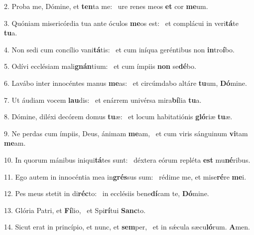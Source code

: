 2. Proba me, Dómine, et \textbf{ten}ta me: \ast\  ure renes meos \textbf{et} cor \textbf{me}um.\

3. Quóniam misericórdia tua ante óculos \textbf{me}os est: \ast\  et complácui in veri\textbf{tá}te \textbf{tu}a.\

4. Non sedi cum concílio vani\textbf{tá}tis: \ast\  et cum iníqua geréntibus non \textbf{in}tro\textbf{í}bo.\

5. Odívi ecclésiam mali\textbf{gnán}tium: \ast\  et cum ímpiis \textbf{non} se\textbf{dé}bo.\

6. Lavábo inter innocéntes manus \textbf{me}as: \ast\  et circúmdabo altáre \textbf{tu}um, \textbf{Dó}mine.\

7. Ut áudiam vocem \textbf{lau}dis: \ast\  et enárrem univérsa mira\textbf{bí}lia \textbf{tu}a.\

8. Dómine, diléxi decórem domus \textbf{tu}æ: \ast\  et locum habitatiónis \textbf{gló}riæ \textbf{tu}æ.\

9. Ne perdas cum ímpiis, Deus, ánimam \textbf{me}am, \ast\  et cum viris sánguinum \textbf{vi}tam \textbf{me}am.\

10. In quorum mánibus iniqui\textbf{tá}tes sunt: \ast\  déxtera eórum repléta \textbf{est} mu\textbf{né}ribus.\

11. Ego autem in innocéntia mea in\textbf{grés}sus sum: \ast\  rédime me, et mise\textbf{ré}re \textbf{me}i.\

12. Pes meus stetit in di\textbf{réc}to: \ast\  in ecclésiis bene\textbf{dí}cam te, \textbf{Dó}mine.\

13. Glória Patri, et \textbf{Fí}lio, \ast\  et Spi\textbf{rí}tui \textbf{Sanc}to.\

14. Sicut erat in princípio, et nunc, et \textbf{sem}per, \ast\  et in sǽcula sæcu\textbf{ló}rum. \textbf{A}men.\

